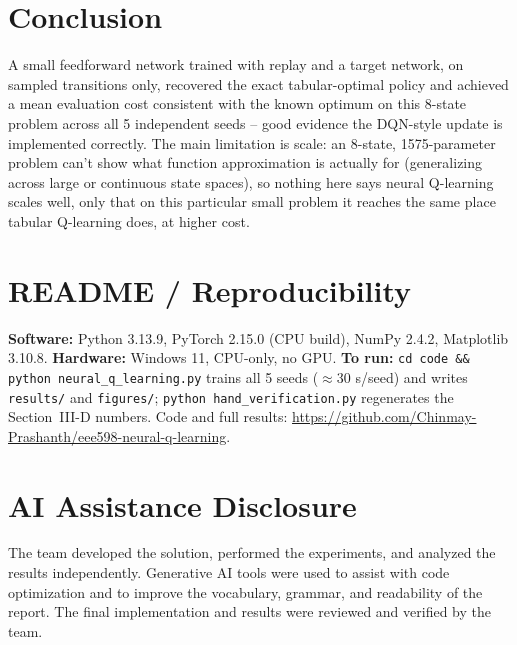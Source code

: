 \documentclass[conference]{IEEEtran}
\begin{document}
\section{Conclusion}
A small feedforward network trained with replay and a target network, on
sampled transitions only, recovered the exact tabular-optimal policy and
achieved a mean evaluation cost consistent with the known optimum on this
8-state problem across all 5 independent seeds -- good evidence the
DQN-style update is implemented correctly. The main
limitation is scale: an 8-state, 1575-parameter problem can't show what
function approximation is actually for (generalizing across large or
continuous state spaces), so nothing here says neural Q-learning scales
well, only that on this particular small problem it reaches the same
place tabular Q-learning does, at higher cost.

\section*{README / Reproducibility}
\textbf{Software:} Python 3.13.9, PyTorch 2.15.0 (CPU build), NumPy 2.4.2,
Matplotlib 3.10.8. \textbf{Hardware:} Windows 11, CPU-only, no GPU.
\textbf{To run:} \texttt{cd code \&\& python neural\_q\_learning.py} trains
all 5 seeds ($\approx$30 s/seed) and writes \texttt{results/} and
\texttt{figures/}; \texttt{python hand\_verification.py} regenerates the
Section~III-D numbers. Code and full results:
\url{https://github.com/Chinmay-Prashanth/eee598-neural-q-learning}.

\section*{AI Assistance Disclosure}
The team developed the solution, performed the experiments, and analyzed
the results independently. Generative AI tools were used to assist with
code optimization and to improve the vocabulary, grammar, and readability
of the report. The final implementation and results were reviewed and
verified by the team.
\end{document}
